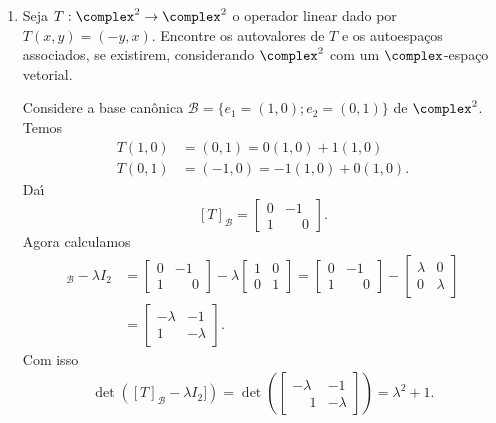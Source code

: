 \begin{exemplo}
\begin{enumerate}[label={\arabic*})]
        \item Seja $T : \complex^2 \to \complex^2$ o operador linear dado por $T(x,y) = (-y,x)$. Encontre os autovalores de $T$ e os autoespaços associados, se existirem, considerando $\complex^2$ com um $\complex$-espaço vetorial.
        \begin{solucao}
            Considere a base can\^onica $\mathcal{B} = \{e_1 = (1, 0); e_2 = (0, 1)\}$ de $\complex^2$. Temos
            \begin{align}
                T(1,0) &= (0,1) = 0(1,0) + 1(1,0)\\
                T(0,1) &= (-1,0) = -1(1,0) + 0(1,0).
            \end{align}
            Da{\'\i}
            \[
                [T]_\mathcal{B} = \begin{bmatrix}0 & -1\\ 1 & \phantom{-}0\end{bmatrix}.
            \]
            Agora calculamos
            \begin{align*}
                [T]_\mathcal{B} - \lambda I_2 &= \begin{bmatrix}0 & -1\\ 1 & \phantom{-}0\end{bmatrix} - \lambda\begin{bmatrix}1 & 0\\0 & 1\end{bmatrix} = \begin{bmatrix}0 & -1\\ 1 & \phantom{-}0\end{bmatrix} - \begin{bmatrix}\lambda & 0\\0 & \lambda\end{bmatrix}\\ &= \begin{bmatrix}-\lambda & -1\\ 1 & -\lambda\end{bmatrix}.
            \end{align*}
            Com isso
            \begin{align*}
                \det([T]_\mathcal{B} - \lambda I_2]) = \det\left(\begin{bmatrix} -\lambda & -1\\\phantom{-}1 & -\lambda\end{bmatrix}\right) = \lambda^2 + 1.
            \end{align*}


\end{solucao}
\end{enumerate}
\end{exemplo}
